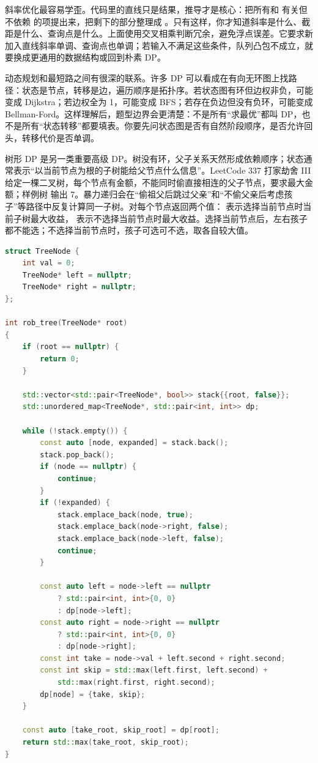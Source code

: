 斜率优化最容易学歪。代码里的直线只是结果，推导才是核心：把所有和  有关但不依赖  的项提出来，把剩下的部分整理成 。只有这样，你才知道斜率是什么、截距是什么、查询点是什么。上面使用交叉相乘判断冗余，避免浮点误差。它要求新加入直线斜率单调、查询点也单调；若输入不满足这些条件，队列凸包不成立，就要换成更通用的数据结构或回到朴素 DP。

动态规划和最短路之间有很深的联系。许多 DP 可以看成在有向无环图上找路径：状态是节点，转移是边，遍历顺序是拓扑序。若状态图有环但边权非负，可能变成 Dijkstra；若边权全为 1，可能变成 BFS；若存在负边但没有负环，可能变成 Bellman-Ford。这样理解后，题型边界会更清楚：不是所有“求最优”都叫 DP，也不是所有“状态转移”都要填表。你要先问状态图是否有自然阶段顺序，是否允许回头，转移代价是否单调。

树形 DP 是另一类重要高级 DP。树没有环，父子关系天然形成依赖顺序；状态通常表示“以当前节点为根的子树能给父节点什么信息”。LeetCode 337 打家劫舍 III 给定一棵二叉树，每个节点有金额，不能同时偷直接相连的父子节点，要求最大金额；样例树  输出 7。暴力递归会在“偷祖父后跳过父亲”和“不偷父亲后考虑孩子”等路径中反复计算同一子树。对每个节点返回两个值： 表示选择当前节点时当前子树最大收益， 表示不选择当前节点时最大收益。选择当前节点后，左右孩子都不能选；不选择当前节点时，孩子可选可不选，取各自较大值。

\begin{lstlisting}[language=C++,caption={LeetCode 337 打家劫舍 III：显式栈后序树形 DP}]
struct TreeNode {
    int val = 0;
    TreeNode* left = nullptr;
    TreeNode* right = nullptr;
};

int rob_tree(TreeNode* root)
{
    if (root == nullptr) {
        return 0;
    }

    std::vector<std::pair<TreeNode*, bool>> stack{{root, false}};
    std::unordered_map<TreeNode*, std::pair<int, int>> dp;

    while (!stack.empty()) {
        const auto [node, expanded] = stack.back();
        stack.pop_back();
        if (node == nullptr) {
            continue;
        }
        if (!expanded) {
            stack.emplace_back(node, true);
            stack.emplace_back(node->right, false);
            stack.emplace_back(node->left, false);
            continue;
        }

        const auto left = node->left == nullptr
            ? std::pair<int, int>{0, 0}
            : dp[node->left];
        const auto right = node->right == nullptr
            ? std::pair<int, int>{0, 0}
            : dp[node->right];
        const int take = node->val + left.second + right.second;
        const int skip = std::max(left.first, left.second) +
            std::max(right.first, right.second);
        dp[node] = {take, skip};
    }

    const auto [take_root, skip_root] = dp[root];
    return std::max(take_root, skip_root);
}
\end{lstlisting}

